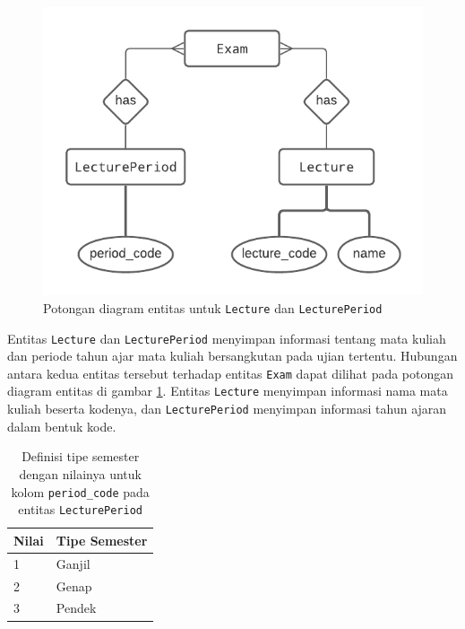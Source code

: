     \begin{figure}
        \centering
        \includegraphics{Gambar/erd-details/ERD--New - Lecture & LecturePeriod.pdf}
        \caption{Potongan diagram entitas untuk \texttt{Lecture} dan
        \texttt{LecturePeriod}}
        \label{fig:erd_lecture-lectureperiod}
    \end{figure}

    Entitas \texttt{Lecture} dan \texttt{LecturePeriod} menyimpan informasi
    tentang mata kuliah dan periode tahun ajar mata kuliah bersangkutan pada
    ujian tertentu. Hubungan antara kedua entitas tersebut terhadap entitas
    \texttt{Exam} dapat dilihat pada potongan diagram entitas di gambar
    \ref{fig:erd_lecture-lectureperiod}.  Entitas \texttt{Lecture} menyimpan
    informasi nama mata kuliah beserta kodenya, dan \texttt{LecturePeriod}
    menyimpan informasi tahun ajaran dalam bentuk kode.
    
    \begin{table}[]
        \centering
        \begin{tabular}{|l|l|}
        \hline
        Nilai & Tipe Semester \\ \hline
        1     & Ganjil        \\ \hline
        2     & Genap         \\ \hline
        3     & Pendek        \\ \hline
        \end{tabular}
        \caption{Definisi tipe semester dengan nilainya untuk kolom
            \texttt{period\_code} pada entitas \texttt{LecturePeriod}}
        \label{tab:lecture-periode}
    \end{table}
    
